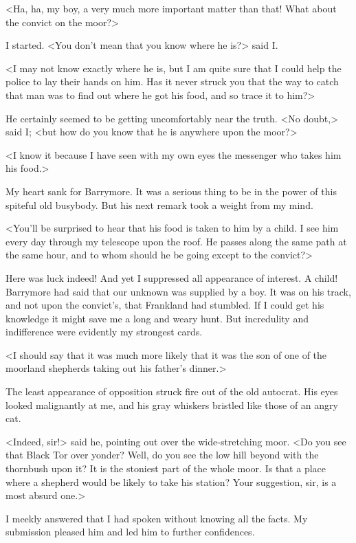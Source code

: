<Ha, ha, my boy, a very much more important matter than that! What about the convict on the moor?>

I started. <You don't mean that you know where he is?> said I\@.

<I may not know exactly where he is, but I am quite sure that I could help the police to lay their hands on him. Has it never struck you that the way to catch that man was to find out where he got his food, and so trace it to him?>

He certainly seemed to be getting uncomfortably near the truth. <No doubt,> said I; <but how do you know that he is anywhere upon the moor?>

<I know it because I have seen with my own eyes the messenger who takes him his food.>

My heart sank for Barrymore. It was a serious thing to be in the power of this spiteful old busybody. But his next remark took a weight from my mind.

<You'll be surprised to hear that his food is taken to him by a child. I see him every day through my telescope upon the roof. He passes along the same path at the same hour, and to whom should he be going except to the convict?>

Here was luck indeed! And yet I suppressed all appearance of interest. A child! Barrymore had said that our unknown was supplied by a boy. It was on his track, and not upon the convict's, that Frankland had stumbled. If I could get his knowledge it might save me a long and weary hunt. But incredulity and indifference were evidently my strongest cards.

<I should say that it was much more likely that it was the son of one of the moorland shepherds taking out his father's dinner.>

The least appearance of opposition struck fire out of the old autocrat. His eyes looked malignantly at me, and his gray whiskers bristled like those of an angry cat.

<Indeed, sir!> said he, pointing out over the wide-stretching moor. <Do you see that Black Tor over yonder? Well, do you see the low hill beyond with the thornbush upon it? It is the stoniest part of the whole moor. Is that a place where a shepherd would be likely to take his station? Your suggestion, sir, is a most absurd one.>

I meekly answered that I had spoken without knowing all the facts. My submission pleased him and led him to further confidences.


